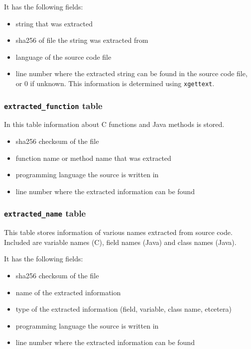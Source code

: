 \documentclass[10pt]{article}
\begin{document}
It has the following fields:

\begin{itemize}
\item string that was extracted
\item sha256 of file the string was extracted from
\item language of the source code file
\item line number where the extracted string can be found in the source code
file, or $0$ if unknown. This information is determined using
\texttt{xgettext}.
\end{itemize}

\subsubsection{\texttt{extracted\_function} table}

In this table information about C functions and Java methods is stored.

\begin{itemize}
\item sha256 checksum of the file
\item function name or method name that was extracted
\item programming language the source is written in
\item line number where the extracted information can be found
\end{itemize}

\subsubsection{\texttt{extracted\_name} table}
This table stores information of various names extracted from source code.
Included are variable names (C), field names (Java) and class names (Java).

It has the following fields:

\begin{itemize}
\item sha256 checksum of the file
\item name of the extracted information
\item type of the extracted information (field, variable, class name, etcetera)
\item programming language the source is written in
\item line number where the extracted information can be found
\end{itemize}
\end{document}
